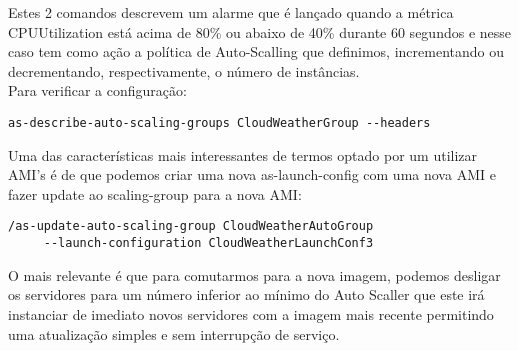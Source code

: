 Estes 2 comandos descrevem um alarme que é lançado quando a métrica CPUUtilization está acima de 80\% ou abaixo de 40\% durante 60 segundos e nesse caso tem como ação a política de Auto-Scalling que definimos, incrementando ou decrementando, respectivamente, o número de instâncias.\\
 Para verificar a configuração: 
\lstset{language=Bash} 
\begin{lstlisting}
as-describe-auto-scaling-groups CloudWeatherGroup --headers
\end{lstlisting}

Uma das características mais interessantes de termos optado por um utilizar AMI's é de que podemos criar uma nova as-launch-config com uma nova AMI e fazer update ao scaling-group  para a nova AMI:\\
\lstset{language=Bash} 
\begin{lstlisting}
/as-update-auto-scaling-group CloudWeatherAutoGroup 
	 --launch-configuration CloudWeatherLaunchConf3
\end{lstlisting}
O mais relevante é que para comutarmos para a nova imagem, podemos desligar os servidores para um número inferior ao mínimo do Auto Scaller que este irá instanciar de imediato novos servidores com a imagem mais recente permitindo uma atualização simples e sem interrupção de serviço.


